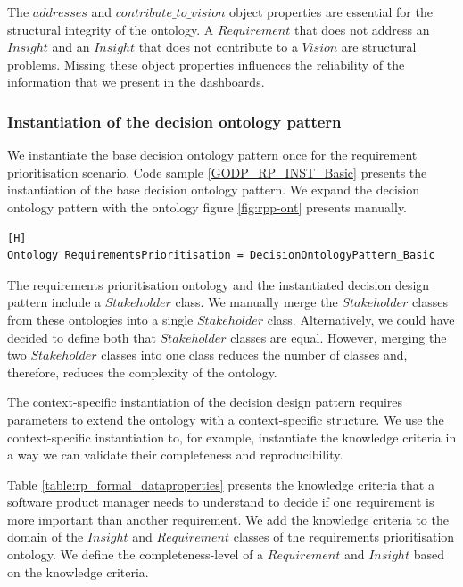 The $addresses$ and $contribute\_to\_vision$ object properties are essential for the structural integrity of the ontology. A $Requirement$ that does not address an $Insight$ and an $Insight$ that does not contribute to a $Vision$ are structural problems. Missing these object properties influences the reliability of the information that we present in the dashboards.

\subsubsection{Instantiation of the decision ontology pattern}
We instantiate the base decision ontology pattern once for the requirement prioritisation scenario. Code sample \ref{GODP_RP_INST_Basic} presents the instantiation of the base decision ontology pattern. We expand the decision ontology pattern with the ontology figure \ref{fig:rpp-ont} presents manually.

\begin{lstlisting}[float,language=GDOL,caption={The GDOL instantiation code of the basic instantiation of the decision design pattern.},label={GODP_RP_INST_Basic}][H]
Ontology RequirementsPrioritisation = DecisionOntologyPattern_Basic
\end{lstlisting}

The requirements prioritisation ontology and the instantiated decision design pattern include a $Stakeholder$ class. We manually merge the $Stakeholder$ classes from these ontologies into a single $Stakeholder$ class. Alternatively, we could have decided to define both that $Stakeholder$ classes are equal. However, merging the two $Stakeholder$ classes into one class reduces the number of classes and, therefore, reduces the complexity of the ontology.

The context-specific instantiation of the decision design pattern requires parameters to extend the ontology with a context-specific structure. We use the context-specific instantiation to, for example, instantiate the knowledge criteria in a way we can validate their completeness and reproducibility.

Table \ref{table:rp_formal_dataproperties} presents the knowledge criteria that a software product manager needs to understand to decide if one requirement is more important than another requirement. We add the knowledge criteria to the domain of the $Insight$ and $Requirement$ classes of the requirements prioritisation ontology. We define the completeness-level of a $Requirement$ and $Insight$ based on the knowledge criteria. 

